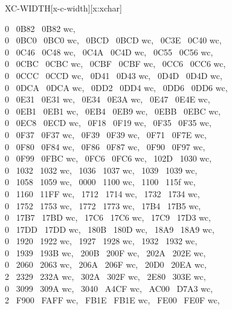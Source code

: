 \begin{worddef*}{}{XC-WIDTH}[x-c-width][x:xchar]
\begin{implement}
	0 ~0B82 ~0B82 wc,\\
	0 ~0BC0 ~0BC0 wc, ~0BCD ~0BCD wc, ~0C3E ~0C40 wc,\\
	0 ~0C46 ~0C48 wc, ~0C4A ~0C4D wc, ~0C55 ~0C56 wc,\\
	0 ~0CBC ~0CBC wc, ~0CBF ~0CBF wc, ~0CC6 ~0CC6 wc,\\
	0 ~0CCC ~0CCD wc, ~0D41 ~0D43 wc, ~0D4D ~0D4D wc,\\
	0 ~0DCA ~0DCA wc, ~0DD2 ~0DD4 wc, ~0DD6 ~0DD6 wc,\\
	0 ~0E31 ~0E31 wc, ~0E34 ~0E3A wc, ~0E47 ~0E4E wc,\\
	0 ~0EB1 ~0EB1 wc, ~0EB4 ~0EB9 wc, ~0EBB ~0EBC wc,\\
	0 ~0EC8 ~0ECD wc, ~0F18 ~0F19 wc, ~0F35 ~0F35 wc,\\
	0 ~0F37 ~0F37 wc, ~0F39 ~0F39 wc, ~0F71 ~0F7E wc,\\
	0 ~0F80 ~0F84 wc, ~0F86 ~0F87 wc, ~0F90 ~0F97 wc,\\
	0 ~0F99 ~0FBC wc, ~0FC6 ~0FC6 wc, ~102D ~1030 wc,\\
	0 ~1032 ~1032 wc, ~1036 ~1037 wc, ~1039 ~1039 wc,\\
	0 ~1058 ~1059 wc, ~0000 ~1100 wc, ~1100 ~115f wc,\\
	0 ~1160 ~11FF wc, ~1712 ~1714 wc, ~1732 ~1734 wc,\\
	0 ~1752 ~1753 wc, ~1772 ~1773 wc, ~17B4 ~17B5 wc,\\
	0 ~17B7 ~17BD wc, ~17C6 ~17C6 wc, ~17C9 ~17D3 wc,\\
	0 ~17DD ~17DD wc, ~180B ~180D wc, ~18A9 ~18A9 wc,\\
	0 ~1920 ~1922 wc, ~1927 ~1928 wc, ~1932 ~1932 wc,\\
	0 ~1939 ~193B wc, ~200B ~200F wc, ~202A ~202E wc,\\
	0 ~2060 ~2063 wc, ~206A ~206F wc, ~20D0 ~20EA wc,\\
	2 ~2329 ~232A wc, ~302A ~302F wc, ~2E80 ~303E wc,\\
	0 ~3099 ~309A wc, ~3040 ~A4CF wc, ~AC00 ~D7A3 wc,\\
	2 ~F900 ~FAFF wc, ~FB1E ~FB1E wc, ~FE00 ~FE0F wc,\\

\end{implement}
\end{worddef*}
